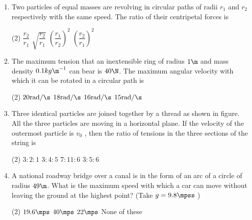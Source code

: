 \documentclass{article}
\begin{document}
\begin{enumerate}
\item Two particles of equal masses are revolving in circular paths of radii $r_1$ and $r_2$ respectively with the same speed. The ratio of their centripetal forces is
\begin{tasks}(2)
	\task $\dfrac{r_2}{r_1}$\ans
	\task $\sqrt{\dfrac{r_2}{r_1}}$
	\task $\left(\dfrac{r_1}{r_2}\right)^2$
	\task $\left(\dfrac{r_2}{r_1}\right)^2$
\end{tasks}

\item The maximum tension that an inextensible ring of radius $1\m$ and mass density $0.1 kg \m^{-1}$ can bear is $40 \N$. The maximum angular velocity with which it can be rotated in a circular path is
\begin{tasks}(2)
	\task $20\text{rad}/\s$\ans
	\task $18\text{rad}/\s$
	\task $16\text{rad}/\s$
	\task $15\text{rad}/\s$
\end{tasks}

\item Three identical particles are joined together by a thread as shown in figure. All the three particles are moving in a horizontal plane. If the velocity of the outermost particle is $v_0$ , then the ratio of tensions in the three sections of the string is
\begin{center}
\end{center}
\begin{tasks}(2)
	\task $3:2:1$\ans
	\task $3:4:5$
	\task $7:11:6$
	\task $3:5:6$
\end{tasks}

\item A national roadway bridge over a canal is in the form of an arc of a circle of radius $49 \m$. What is the maximum speed with which a car can move without leaving the ground at the highest point? (Take $g = 9.8 \mpss$ )
\begin{tasks}(2)
	\task $19.6\mps$
	\task $40\mps$
	\task $22\mps$\ans
	\task None of these
\end{tasks}


\end{enumerate}
\end{document}
